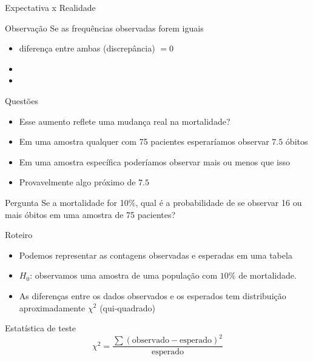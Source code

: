 \documentclass{beamer}
\begin{document}
\begin{frame}{\small Expectativa x Realidade}
  \begin{block}{Observação}
    Se as frequências observadas forem iguais
    \begin{itemize}
      \small
    \item diferença entre ambas (discrepância) $= 0$
    \item%
    \item%
    \end{itemize}
    \bigskip
  \end{block}
\end{frame}

\begin{frame}{\scriptsize Questões}
  \begin{itemize}
    \footnotesize
  \item Esse aumento reflete uma mudança real na mortalidade?
  \item Em uma amostra qualquer com 75 pacientes esperaríamos observar $7.5$ óbitos
  \item Em uma amostra específica poderíamos observar mais ou menos
    que isso
  \item Provavelmente algo próximo de $7.5$
  \end{itemize}

  \begin{block}{Pergunta}
    Se a mortalidade for 10\%, qual é a probabilidade de se observar
    16 ou mais óbitos em uma amostra de 75 pacientes?
  \end{block}
\end{frame}

\begin{frame}{\scriptsize Roteiro}
  \begin{itemize}
    \footnotesize
  \item Podemos representar as contagens observadas e esperadas em uma tabela
  \item $H_0$: \alert{observamos uma amostra de uma população com
      $10\%$ de mortalidade}.
  \item As diferenças entre os dados observados e os esperados tem
    distribuição aproximadamente $\chi^2$ (qui-quadrado)
  \end{itemize}
  \begin{block}{Estatística de teste}
    $$\chi^2 = \frac{\sum (\text{observado} - \text{esperado})^2 }{\text{esperado}}$$
  \end{block}
\end{frame}
\end{document}
